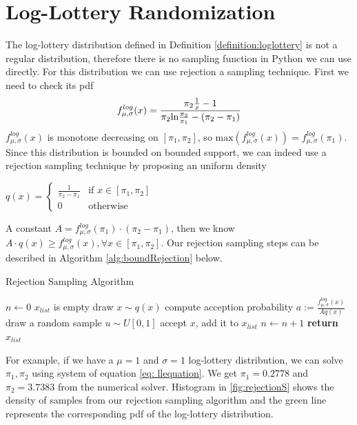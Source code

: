 \section{Log-Lottery Randomization}
The log-lottery distribution defined in Definition \ref{definition:loglottery} is not a regular distribution, therefore there is no sampling function in Python we can use directly. For this distribution we can use rejection a sampling technique. First we need to check its pdf
\begin{equation}\notag
	f^{log}_{\mu,\sigma} (x) =  \frac{\pi_2\frac{1}{x} -1}{\pi_2 \text{ln} \frac{\pi_2}{\pi_1} - (\pi_2-\pi_1)}
\end{equation} \label{eq: llequation}
$f^{log}_{\mu,\sigma} (x)$ is monotone decreasing on $[\pi_1,\pi_2]$, so $\text{max}(f^{log}_{\mu,\sigma} (x)) = f^{log}_{\mu,\sigma} (\pi_1)$.
Since this distribution is bounded on bounded support, we can indeed use a rejection sampling technique by proposing an uniform density
\begin{center}
	$q(x) = \begin{cases} \frac{1}{\pi_2 - \pi_1}  & \text{if } x \in [\pi_1, \pi_2] \\ 0   & \text{otherwise } \end{cases}$
\end{center}
A constant $A = f^{log}_{\mu,\sigma} (\pi_1)\cdot (\pi_2 - \pi_1)$, then we know $A \cdot q(x) \geqslant	f^{log}_{\mu,\sigma} (x) , 	\forall x \in [\pi_1,\pi_2]$. Our rejection sampling steps can be described in Algorithm \ref{alg:boundRejection} below.
\begin{algorithm}[H]
	\caption{Rejection Sampling Algorithm}\label{alg:boundRejection}
	\begin{algorithmic}[1]
		\State $n \gets 0$
		\State $x_{list}$ is empty
			\State draw $x \sim q(x)$		
			\State compute acception probability $a := \frac{f^{log}_{\mu,\sigma} (x) }{Aq(x)}$
			\State draw a random sample $u \sim U[0,1]$
				\State accept $x$, add it to $x_{list}$
				\State $n\gets n+1$	
			\EndIf
		\EndWhile
		\State \textbf{return} $x_{list}$
		\EndProcedure
	\end{algorithmic}
\end{algorithm}
For example, if we have a $\mu = 1$ and $\sigma = 1$ log-lottery distribution, we can solve $\pi_1, \pi_2$ using system of equation \cref{eq: llequation}. We get $\pi_1 = 0.2778$ and $\pi_2 = 3.7383$ from the numerical solver. Histogram in \cref{fig:rejectionS} shows the density of samples from our rejection sampling algorithm and the green line represents the corresponding pdf of the log-lottery distribution.
